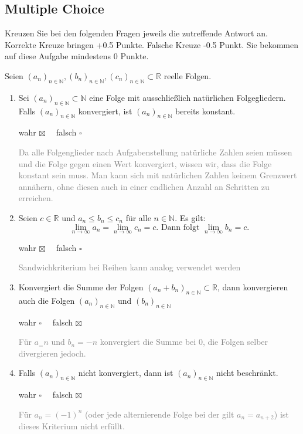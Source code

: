 \documentclass[a4paper]{article}
\begin{document}
\setcounter{section}{2}
\subsection{Multiple Choice}
Kreuzen Sie bei den folgenden Fragen jeweils die zutreffende Antwort an. Korrekte Kreuze bringen +0.5 Punkte. Falsche Kreuze -0.5 Punkt. Sie bekommen auf diese Aufgabe mindestens 0 Punkte.

\bigskip
\noindent Seien $(a_n)_{n\in\mathbb{N}}, (b_n)_{n\in\mathbb{N}},(c_n)_{n\in\mathbb{N}} \subset \mathbb{R}$ reelle Folgen.
\begin{enumerate}[label=(\alph*)]
    \item Sei $(a_n)_{n\in\mathbb{N}}\subset \mathbb{N}$ eine Folge mit ausschließlich natürlichen Folgegliedern. Falls $(a_n)_{n\in\mathbb{N}}$ konvergiert, ist $(a_n)_{n\in\mathbb{N}}$ bereits konstant. \begin{flushright} wahr $\boxtimes \quad$ falsch $\square$ \end{flushright}
    \textcolor{gray}{Da alle Folgenglieder nach Aufgabenstellung natürliche Zahlen seien müssen und die Folge gegen einen Wert konvergiert, wissen wir, dass die Folge konstant sein muss. Man kann sich mit natürlichen Zahlen keinem Grenzwert annähern, ohne diesen auch in einer endlichen Anzahl an Schritten zu erreichen.}
    \item Seien $c \in \mathbb{R}$ und $a_n\leq b_n\leq c_n$ für alle $n \in \mathbb{N}$. Es gilt:
    \[\lim\limits_{n\to\infty}a_n= \lim\limits_{n\to\infty}c_n=c. \text{ Dann folgt } \lim\limits_{n\to\infty}b_n=c.\]\begin{flushright} wahr $\boxtimes \quad$ falsch $\square$ \end{flushright}
    \textcolor{gray}{Sandwichkriterium bei Reihen kann analog verwendet werden}
    \item Konvergiert die Summe der Folgen $(a_n+b_n)_{n\in\mathbb{N}}\subset \mathbb{R}$, dann konvergieren auch die Folgen $(a_n)_{n\in\mathbb{N}}$ und $(b_n)_{n\in\mathbb{N}}$\begin{flushright} wahr $\square \quad$ falsch $\boxtimes$ \end{flushright} \textcolor{gray}{Für $a_=n$ und $b_n=-n$ konvergiert die Summe bei 0, die Folgen selber divergieren jedoch.}
    \item Falls $(a_n)_{n\in\mathbb{N}}$ nicht konvergiert, dann ist $(a_n)_{n\in\mathbb{N}}$ nicht beschränkt.\begin{flushright} wahr $\square \quad$ falsch $\boxtimes$ \end{flushright}
    \textcolor{gray}{Für $a_n=(-1)^n$ (oder jede alternierende Folge bei der gilt $a_n = a_{n+2}$) ist dieses Kriterium nicht erfüllt.}
\end{enumerate}
\end{document}
